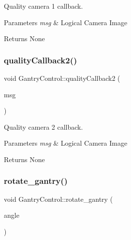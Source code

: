 Quality camera 1 callback. 


\begin{DoxyParams}{Parameters}
{\em msg} & Logical Camera Image \\
\hline
\end{DoxyParams}
\begin{DoxyReturn}{Returns}
None 
\end{DoxyReturn}
\mbox{\label{classGantryControl_a355b299969bfa74073062ba1c6c1ec04}} 
\subsubsection{\texorpdfstring{quality\+Callback2()}{qualityCallback2()}}
{\footnotesize\ttfamily void Gantry\+Control\+::quality\+Callback2 (\begin{DoxyParamCaption}\item[{const nist\+\_\+gear\+::\+Logical\+Camera\+Image \&}]{msg }\end{DoxyParamCaption})}



Quality camera 2 callback. 


\begin{DoxyParams}{Parameters}
{\em msg} & Logical Camera Image \\
\hline
\end{DoxyParams}
\begin{DoxyReturn}{Returns}
None 
\end{DoxyReturn}
\mbox{\label{classGantryControl_ad7a304b37a95f29634631d4183276be3}} 
\subsubsection{\texorpdfstring{rotate\+\_\+gantry()}{rotate\_gantry()}}
{\footnotesize\ttfamily void Gantry\+Control\+::rotate\+\_\+gantry (\begin{DoxyParamCaption}\item[{double}]{angle }\end{DoxyParamCaption})}



